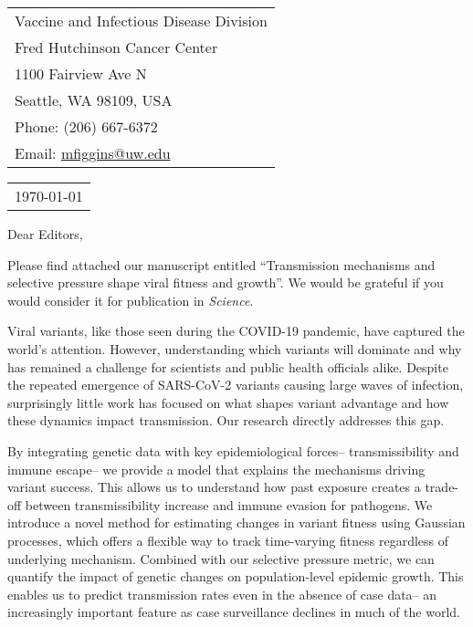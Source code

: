 \documentclass[11pt]{article}
\begin{document}
\thispagestyle{empty} %

\mbox{}\hfill
\begin{tabular}{l @{}}
	Vaccine and Infectious Disease Division \\
	Fred Hutchinson Cancer Center \\
	1100 Fairview Ave N \\
	Seattle, WA 98109, USA \\
	Phone: (206) 667-6372 \\
	Email: \href{mailto:mfiggins@uw.edu}{mfiggins@uw.edu} \\
\end{tabular}

\vspace{0.1in} %

\begin{tabular}{@{} l}
  \today
\end{tabular}

\vspace{0.1in} %

Dear Editors,

\medskip %

Please find attached our manuscript entitled ``Transmission mechanisms and selective pressure shape viral fitness and growth''.
We would be grateful if you would consider it for publication in \textit{Science}.

Viral variants, like those seen during the COVID-19 pandemic, have captured the world’s attention.
However, understanding which variants will dominate and why has remained a challenge for scientists and public health officials alike.
Despite the repeated emergence of SARS-CoV-2 variants causing large waves of infection, surprisingly little work has focused on what shapes variant advantage and how these dynamics impact transmission.
Our research directly addresses this gap.

By integrating genetic data with key epidemiological forces-- transmissibility and immune escape-- we provide a model that explains the mechanisms driving variant success.
This allows us to understand how past exposure creates a trade-off between transmissibility increase and immune evasion for pathogens.
We introduce a novel method for estimating changes in variant fitness using Gaussian processes, which offers a flexible way to track time-varying fitness regardless of underlying mechanism.
Combined with our selective pressure metric, we can quantify the impact of genetic changes on population-level epidemic growth.
This enables us to predict transmission rates even in the absence of case data-- an increasingly important feature as case surveillance declines in much of the world.
\end{document}
